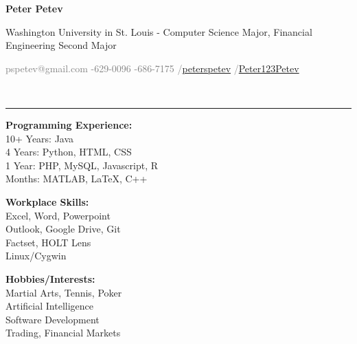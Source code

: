 \documentclass[11pt]{article}
\begin{document}
	\begin{titlepage}
		\small
			\begin{center}
				\centerline{{\Large \textbf{Peter Petev}}}
				\centerline{Washington University in St. Louis - Computer Science Major, Financial Engineering Second Major}
				\small
				\begin{minipage}[b]{\textwidth}
					\textcolor{gray}{\faEnvelope \space pspetev@gmail.com}\hfill
					\textcolor{gray}{\faMobilePhone {}-629-0096}\hfill
					\textcolor{gray}{\faPhoneSquare {}-686-7175}\hfill
					\textcolor{gray}{\faLinkedinSquare \slash \href{http://www.linkedin.com/in/peterspetev}{peterspetev}}\hfill
					\textcolor{gray}{\faGithubSquare \slash \href{http://www.github.com/Peter123Petev}{Peter123Petev}}
				\end{minipage}
			\end{center}
		\vspace{-15pt}
		\noindent\makebox[\linewidth]{\rule{\paperwidth}{0.4pt}}\vspace{5pt}
		\\\rule{\textwidth}{0.4pt}
		\begin{addmargin}[1em]{0em}
			\vspace{-10pt}
			\begin{center}
				\begin{minipage}[b]{0.4\textwidth}
					\textbf{Programming Experience:}\\ 10+ Years: Java\\ 4 Years: Python, HTML, CSS\\ 1 Year: PHP, MySQL, Javascript, R\\Months: MATLAB, \LaTeX, C++\\
				\end{minipage}%
				\begin{minipage}[b]{0.3\textwidth}
					\textbf{Workplace Skills:}\\ Excel, Word, Powerpoint\\ Outlook, Google Drive, Git\\ Factset, HOLT Lens\\Linux/Cygwin\\
				\end{minipage}%
				\begin{minipage}[b]{0.3\textwidth}
					\textbf{Hobbies/Interests:}\\ Martial Arts, Tennis, Poker\\ Artificial Intelligence\\ Software Development\\ Trading, Financial Markets\\

\end{minipage}
\end{center}
\end{addmargin}
\end{titlepage}
\end{document}
